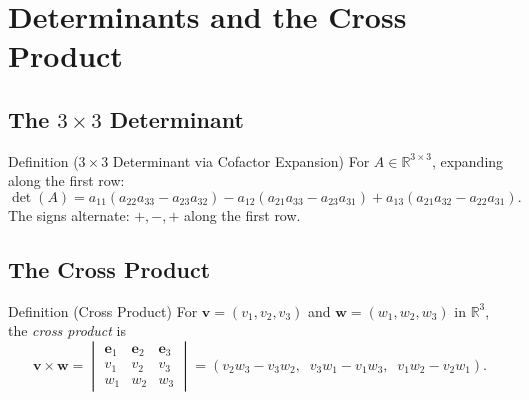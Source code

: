 
\section{Determinants and the Cross Product}

\subsection*{\texorpdfstring{The $3 \times 3$ Determinant}{The 3 x 3 Determinant}}

\begin{propositionbox}{Definition ($3 \times 3$ Determinant via Cofactor Expansion)}
For $A \in \mathbb{R}^{3 \times 3}$, expanding along the first row:
\[
  \det(A) = a_{11}(a_{22}a_{33} - a_{23}a_{32})
           - a_{12}(a_{21}a_{33} - a_{23}a_{31})
           + a_{13}(a_{21}a_{32} - a_{22}a_{31}).
\]
The signs alternate: $+, -, +$ along the first row.
\end{propositionbox}

\subsection*{The Cross Product}

\begin{propositionbox}{Definition (Cross Product)}
For $\mathbf{v} = (v_1, v_2, v_3)$ and $\mathbf{w} = (w_1, w_2, w_3)$ in $\mathbb{R}^3$,
the \emph{cross product} is
\[
  \mathbf{v} \times \mathbf{w}
  = \begin{vmatrix} \mathbf{e}_1 & \mathbf{e}_2 & \mathbf{e}_3 \\
                    v_1 & v_2 & v_3 \\
                    w_1 & w_2 & w_3
    \end{vmatrix}
  = (v_2 w_3 - v_3 w_2,\;\; v_3 w_1 - v_1 w_3,\;\; v_1 w_2 - v_2 w_1).
\]
\end{propositionbox}

